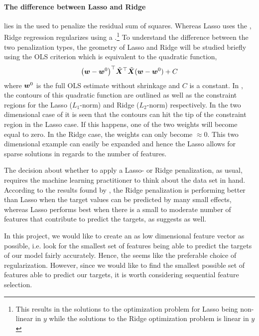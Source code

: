 \paragraph{The difference between Lasso and Ridge} lies in the  used to penalize the residual sum of squares. Whereas Lasso uses the , Ridge regression regularizes using a .\footnote{This results in the solutions to the optimization problem for Lasso being non-linear in $y$ while the solutions to the Ridge optimization problem is linear in $y$} To understand the difference between the two penalization types, the geometry of Lasso and Ridge will be studied briefly using the OLS criterion which is equivalent to the quadratic function,
\begin{align}
    \qty(\boldsymbol{w} - \boldsymbol{w}^0)^{\top} \tilde{\bm{X}}^{\top} \tilde{\bm{X}} (\boldsymbol{w} - \boldsymbol{w}^0)+C
\end{align}
where $\boldsymbol{w}^0$ is the full OLS estimate without shrinkage and $C$ is a constant. In , the contours of this quadratic function are outlined as well as the constraint regions for the Lasso ($L_1$-norm) and Ridge ($L_2$-norm) respectively. In the two dimensional case of  it is seen that the contours can hit the tip of the constraint region in the Lasso case. If this happens, one of the two weights will become equal to zero. In the Ridge case, the weights can only become $\approx 0$. This two dimensional example can easily be expanded and hence the Lasso allows for sparse solutions in regards to the number of features. 

The decision about whether to apply a Lasso- or Ridge penalization, as usual, requires the machine learning practitioner to think about the data set in hand. According to the results found by \citep{Tibshirani94regressionshrinkage}, the Ridge penalization is performing better than Lasso when the target values can be predicted by many small effects, whereas Lasso performs best when there is a small to moderate number of features that contribute to predict the targets, as  suggests as well.

In this project, we would like to create an as low dimensional feature vector as possible, i.e. look for the smallest set of features being able to predict the targets of our model fairly accurately. Hence, the  seems like the preferable choice of regularization. However, since we would like to find the smallest possible set of features able to predict our targets, it is worth considering sequential feature selection.

